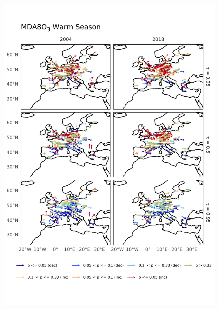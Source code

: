 \documentclass[journal abbreviation, manuscript]{copernicus}
\begin{document}
\begin{figure}[h!]
\centering
\includegraphics[height=\textheight]{figures/paper_figures/o3_map/o3_map_piecewise_stats_freeTau_mda8_anom_warm_eu_o3.pdf}
\caption{}
\label{fig:o3_map_eu_mda8_warm}
\end{figure}
\end{document}
